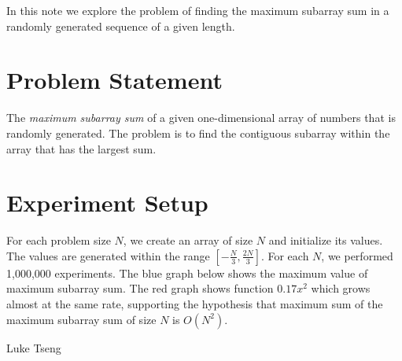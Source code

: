 \documentclass{article}
\begin{document}
In this note we explore the problem of finding the maximum subarray sum in a randomly generated sequence of a given
length.

\section{Problem Statement}
The \textit{maximum subarray sum} of a given one-dimensional array of numbers that is randomly generated. The problem is to find the contiguous subarray within the array that has the largest sum.

\section{Experiment Setup}

For each problem size $N$, we create an array of size $N$ and initialize its values. The values are generated within the range $[-\frac{N}{3}, \frac{2N}{3}]$. For each $N$, we performed 1,000,000 experiments. The blue graph below shows the maximum value of maximum subarray sum. The red graph shows function $0.17x^2$ which grows almost at the same rate, supporting the hypothesis that maximum sum of the maximum subarray sum of size $N$ is $O(N^2)$.


Luke Tseng
\end{document}

